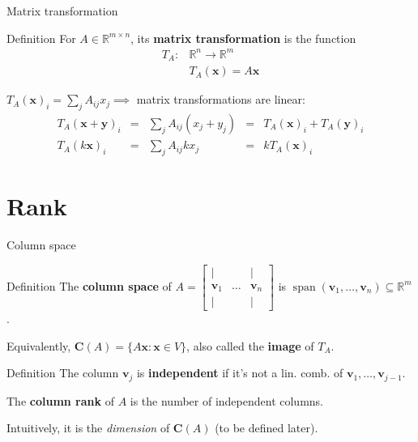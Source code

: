 \documentclass[10pt]{beamer}
\begin{document}
\begin{frame}{Matrix transformation}
    \begin{block}{Definition}
        For $A \in \mathbb R^{m \times n}$, its \textbf{matrix transformation} is the function
        \begin{align*}
            T_A :& \mathbb R^n \to \mathbb R^m \\
            & T_A(\mathbf x) =  A \mathbf x
        \end{align*}
    \end{block}
    $T_A(\mathbf x)_i = \sum\limits_j A_{ij} x_j \implies$ matrix transformations are linear:
     \begin{align*}
        T_A(\mathbf x + \mathbf y)_i &=& \sum\limits_j A_{ij} (x_j + y_j) &=& T_A(\mathbf x)_i + T_A(\mathbf y)_i \\
        T_A(k \mathbf x)_i &=& \sum\limits_j A_{ij} kx_j &=& k T_A(\mathbf x)_i
    \end{align*}
\end{frame}

\section{Rank}
\begin{frame}{Column space}
    \begin{block}{Definition}
        The \textbf{column space} of $A = \begin{bmatrix}
        | &   & | \\
        \mathbf v_1 & \dots & \mathbf v_n \\
        | &   & |
    \end{bmatrix}$ is $\operatorname{span}(\mathbf v_1, \dots,\mathbf v_n) \subseteq \mathbb R^m$.
    \end{block}
    Equivalently, $\mathbf C(A) = \{A\mathbf x : \mathbf x \in V\}$, also called the \textbf{image} of $T_A$.
    \begin{block}{Definition}
        The column $\mathbf v_j$ is \textbf{independent} if it's not a lin. comb. of $\mathbf v_1, \dots, \mathbf v_{j-1}$.

        The \textbf{column rank} of $A$ is the number of independent columns.
    \end{block}
    Intuitively, it is the \textit{dimension} of $\mathbf C(A)$ (to be defined later).
\end{frame}
\end{document}
